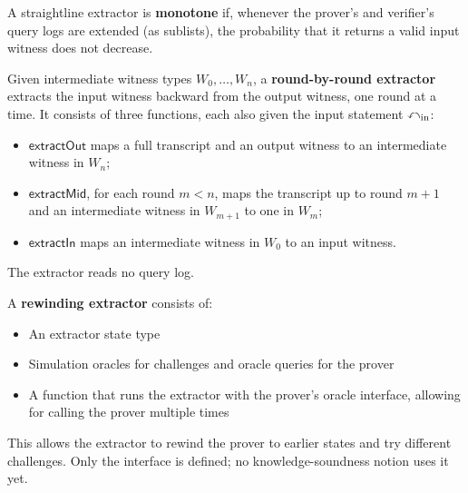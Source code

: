 \begin{definition}
    \label{def:monotone_straightline_extractor}
    A straightline extractor is \textbf{monotone} if, whenever the prover's and verifier's query
    logs are extended (as sublists), the probability that it returns a valid input witness does
    not decrease.
    \leanok
\end{definition}

\begin{definition}
    \label{def:rbr_extractor}
    Given intermediate witness types \(W_0, \ldots, W_n\), a \textbf{round-by-round extractor}
    extracts the input witness backward from the output witness, one round at a time. It consists
    of three functions, each also given the input statement \(\mathbb{x}_{\text{in}}\):
    \begin{itemize}
        \item \(\mathsf{extractOut}\) maps a full transcript and an output witness to an
        intermediate witness in \(W_n\);
        \item \(\mathsf{extractMid}\), for each round \(m < n\), maps the transcript up to round \(m+1\)
        and an intermediate witness in \(W_{m+1}\) to one in \(W_m\);
        \item \(\mathsf{extractIn}\) maps an intermediate witness in \(W_0\) to an input witness.
    \end{itemize}
    The extractor reads no query log.
    \leanok
\end{definition}

\begin{definition}
    \label{def:rewinding_extractor}
    A \textbf{rewinding extractor} consists of:
    \begin{itemize}
        \item An extractor state type
        \item Simulation oracles for challenges and oracle queries for the prover
        \item A function that runs the extractor with the prover's oracle interface, allowing for calling the prover multiple times
    \end{itemize}
    This allows the extractor to rewind the prover to earlier states and try different challenges.
    Only the interface is defined; no knowledge-soundness notion uses it yet.
    \leanok
\end{definition}

